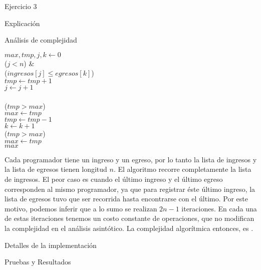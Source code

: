 \begin{section}{Ejercicio 3}
\begin{subsection}{Explicación}
\begin{subsubsection}{Análisis de complejidad}
			\begin{pseudo}
				\tab $max,tmp,j,k \leftarrow 0$ \\
				\tab \WHILE($j< n$) &   \\
				\tab \tab \IF($ingresos[j]\leq egresos[k]$) \\
				\tab \tab \tab $tmp \leftarrow tmp+1$ \\
				\tab \tab \tab $j \leftarrow j+1$ \\
				\tab \tab \ELSE \\
				\tab \tab \tab \IF($tmp>max$) \\
				\tab \tab \tab \tab $max \leftarrow tmp$ \\
				\tab \tab \tab $tmp \leftarrow tmp - 1$ \\
				\tab \tab \tab $k \leftarrow k+1$ \\
				\tab \IF($tmp>max$) \\
				\tab \tab $max \leftarrow tmp$ \\
				\tab \RET $max$
			\end{pseudo}

			Cada programador tiene un ingreso y un egreso, por lo tanto la lista de ingresos y la lista de egresos
			tienen longitud $n$. El algoritmo recorre completamente la lista de ingresos. El peor caso es 
			cuando el último ingreso y el último egreso corresponden al mismo programador, ya que para registrar éste
			último ingreso, la lista de egresos tuvo que ser recorrida hasta encontrarse con el último.
 			Por este motivo, podemos inferir que a lo sumo se realizan $2n -1$ iteraciones. En cada una de estas 
			iteraciones tenemos un costo constante de operaciones, que no modifican la complejidad en el análisis 
			asintótico.
			La complejidad algorítmica entonces, es .

		\end{subsubsection}

	\end{subsection}

	\begin{subsection}{Detalles de la implementación}

	\end{subsection}

	\begin{subsection}{Pruebas y Resultados}			
	\end{subsection}

\end{section}







